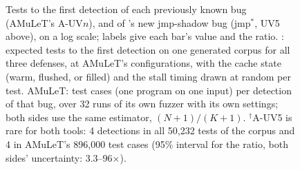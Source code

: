 \begin{figure}[t]
\centering

\caption{
Tests to the first detection of each previously known bug (AMuLeT's A-UV$n$), and of \toolname{}'s new jmp-shadow bug (jmp$^{*}$, UV5 above), on a log scale; labels give each bar's value and the ratio. \toolname{}: expected tests to the first detection on one generated corpus for all three defenses, at AMuLeT's configurations, with the cache state (warm, flushed, or filled) and the stall timing drawn at random per test. AMuLeT: test cases (one program on one input) per detection of that bug, over 32 runs of its own fuzzer with its own settings; both sides use the same estimator, $(N{+}1)/(K{+}1)$. $^{\dagger}$A-UV5 is rare for both tools: 4 detections in all 50{,}232 tests of the corpus and 4 in AMuLeT's 896{,}000 test cases (95\% interval for the ratio, both sides' uncertainty: 3.3--96$\times$).}
\label{fig:firstdetv2}
\end{figure}
